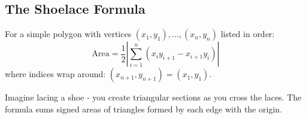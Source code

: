 \subsection{The Shoelace Formula}
\label{ssec:shoelace_formula}

\begin{theorem}
For a simple polygon with vertices $(x_1,y_1), ..., (x_n,y_n)$ listed in order:
$$\text{Area} = \frac{1}{2}\left|\sum_{i=1}^{n} (x_i y_{i+1} - x_{i+1} y_i)\right|$$
where indices wrap around: $(x_{n+1}, y_{n+1}) = (x_1, y_1)$.
\end{theorem}

\begin{intuition}
Imagine lacing a shoe - you create triangular sections as you cross the laces. The formula sums signed areas of triangles formed by each edge with the origin.
\end{intuition} 